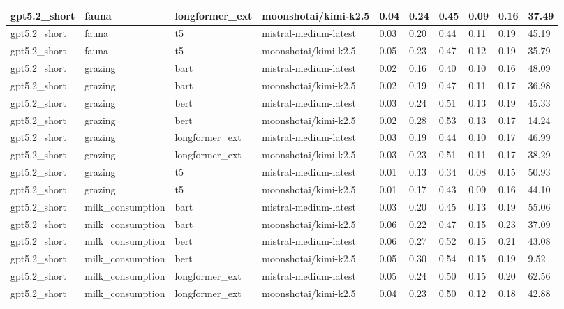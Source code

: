 \begin{tabular}{|l|l|l|l|l|l|l|l|l|l|}
 \hline
 gpt5.2\_short & fauna & longformer\_ext & moonshotai/kimi-k2.5 & 0.04 & 0.24 & 0.45 & 0.09 & 0.16 & 37.49 \\
 \hline
 gpt5.2\_short & fauna & t5 & mistral-medium-latest & 0.03 & 0.20 & 0.44 & 0.11 & 0.19 & 45.19 \\
 \hline
 gpt5.2\_short & fauna & t5 & moonshotai/kimi-k2.5 & 0.05 & 0.23 & 0.47 & 0.12 & 0.19 & 35.79 \\
 \hline
 gpt5.2\_short & grazing & bart & mistral-medium-latest & 0.02 & 0.16 & 0.40 & 0.10 & 0.16 & 48.09 \\
 \hline
 gpt5.2\_short & grazing & bart & moonshotai/kimi-k2.5 & 0.02 & 0.19 & 0.47 & 0.11 & 0.17 & 36.98 \\
 \hline
 gpt5.2\_short & grazing & bert & mistral-medium-latest & 0.03 & 0.24 & 0.51 & 0.13 & 0.19 & 45.33 \\
 \hline
 gpt5.2\_short & grazing & bert & moonshotai/kimi-k2.5 & 0.02 & 0.28 & 0.53 & 0.13 & 0.17 & 14.24 \\
 \hline
 gpt5.2\_short & grazing & longformer\_ext & mistral-medium-latest & 0.03 & 0.19 & 0.44 & 0.10 & 0.17 & 46.99 \\
 \hline
 gpt5.2\_short & grazing & longformer\_ext & moonshotai/kimi-k2.5 & 0.03 & 0.23 & 0.51 & 0.11 & 0.17 & 38.29 \\
 \hline
 gpt5.2\_short & grazing & t5 & mistral-medium-latest & 0.01 & 0.13 & 0.34 & 0.08 & 0.15 & 50.93 \\
 \hline
 gpt5.2\_short & grazing & t5 & moonshotai/kimi-k2.5 & 0.01 & 0.17 & 0.43 & 0.09 & 0.16 & 44.10 \\
 \hline
 gpt5.2\_short & milk\_consumption & bart & mistral-medium-latest & 0.03 & 0.20 & 0.45 & 0.13 & 0.19 & 55.06 \\
 \hline
 gpt5.2\_short & milk\_consumption & bart & moonshotai/kimi-k2.5 & 0.06 & 0.22 & 0.47 & 0.15 & 0.23 & 37.09 \\
 \hline
 gpt5.2\_short & milk\_consumption & bert & mistral-medium-latest & 0.06 & 0.27 & 0.52 & 0.15 & 0.21 & 43.08 \\
 \hline
 gpt5.2\_short & milk\_consumption & bert & moonshotai/kimi-k2.5 & 0.05 & 0.30 & 0.54 & 0.15 & 0.19 & 9.52 \\
 \hline
 gpt5.2\_short & milk\_consumption & longformer\_ext & mistral-medium-latest & 0.05 & 0.24 & 0.50 & 0.15 & 0.20 & 62.56 \\
 \hline
 gpt5.2\_short & milk\_consumption & longformer\_ext & moonshotai/kimi-k2.5 & 0.04 & 0.23 & 0.50 & 0.12 & 0.18 & 42.88 \\

\end{tabular}
